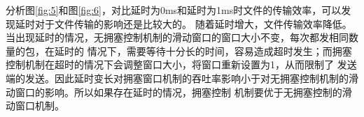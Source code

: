 \documentclass[a4paper]{article}
\begin{document}
分析图\ref{fig:5}和图\ref{fig:6}，对比延时为0ms和延时为1ms时文件的传输效率，可以发现延时对于文件传输的影响还是比较大的。
随着延时增大，文件传输效率降低。当出现延时的情况，无拥塞控制机制的滑动窗口的窗口大小不变，每次都发相同数量的包，在延时的
情况下，需要等待十分长的时间，容易造成超时发生；而拥塞控制机制在超时的情况下会调整窗口大小，将窗口重新设置为1，从而限制了
发送端的发送。因此延时变长对拥塞窗口机制的吞吐率影响小于对无拥塞控制机制的滑动窗口的影响。所以如果存在延时的情况，拥塞控制
机制要优于无拥塞控制的滑动窗口机制。
\end{document}

